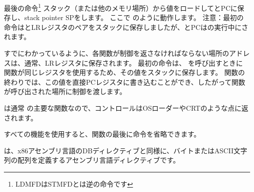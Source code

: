 最後の命令\footnote{\ac{LDMFD}は\ac{STMFD}とは逆の命令です}
スタック（または他のメモリ場所）から値をロードしてと\ac{PC}に保存し、\gls{stack pointer} \ac{SP}をします。
ここで \POP のように動作します。
注意：最初の命令はと\ac{LR}レジスタのペアをスタックに保存しましたが、と\ac{PC}はの実行中にされます。

すでにわかっているように、各関数が制御を返さなければならない場所のアドレスは、通常、\ac{LR}レジスタに保存されます。
最初の命令は、 \printf を呼び出すときに \main 関数が同じレジスタを使用するため、その値をスタックに保存します。
関数の終わりでは、この値を直接\ac{PC}レジスタに書き込むことができ、したがって関数が呼び出された場所に制御を渡します。

\main は通常 \CCpp の主要な関数なので、コントロールは\ac{OS}ローダーや\ac{CRT}のような点に返されます。

すべての機能を使用すると、関数の最後に命令を省略できます。

は、x86アセンブリ言語のDBディレクティブと同様に、バイトまたはASCII文字列の配列を定義するアセンブリ言語ディレクティブです。
